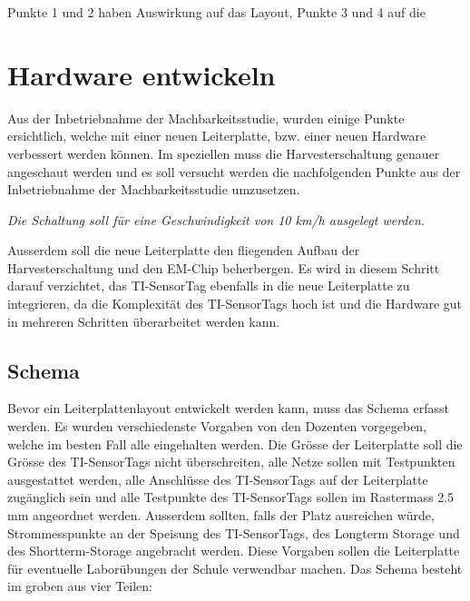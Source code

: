 Punkte 1 und 2 haben Auswirkung auf das Layout, Punkte 3 und 4 auf die 








\section{Hardware entwickeln}

Aus der Inbetriebnahme der Machbarkeitsstudie, wurden einige Punkte ersichtlich, welche mit einer neuen Leiterplatte, bzw. einer neuen Hardware verbessert werden können. Im speziellen muss die Harvesterschaltung genauer angeschaut werden und es soll versucht werden die nachfolgenden Punkte aus der Inbetriebnahme der Machbarkeitsstudie umzusetzen. 

\textit{Die Schaltung soll für eine Geschwindigkeit von 10 km/h ausgelegt werden.}

Ausserdem soll die neue Leiterplatte den fliegenden Aufbau der Harvesterschaltung und den EM-Chip beherbergen. Es wird in diesem Schritt darauf verzichtet, das TI-SensorTag ebenfalls in die neue Leiterplatte zu integrieren, da die Komplexität des TI-SensorTags hoch ist und die Hardware gut in mehreren Schritten überarbeitet werden kann.

\subsection{Schema}

Bevor ein Leiterplattenlayout entwickelt werden kann, muss das Schema erfasst werden. Es wurden verschiedenste Vorgaben von den Dozenten vorgegeben, welche im besten Fall alle eingehalten werden. Die Grösse der Leiterplatte soll die Grösse des TI-SensorTags nicht überschreiten, alle Netze sollen mit Testpunkten ausgestattet werden, alle Anschlüsse des TI-SensorTags auf der Leiterplatte zugänglich sein und alle Testpunkte des TI-SensorTags sollen im Rastermass 2.5 mm angeordnet werden. Ausserdem sollten, falls der Platz ausreichen würde, Strommesspunkte an der Speisung des TI-SensorTags, des Longterm Storage und des Shortterm-Storage angebracht werden. Diese Vorgaben sollen die Leiterplatte für eventuelle Laborübungen der Schule verwendbar machen. Das Schema besteht im groben aus vier Teilen:

